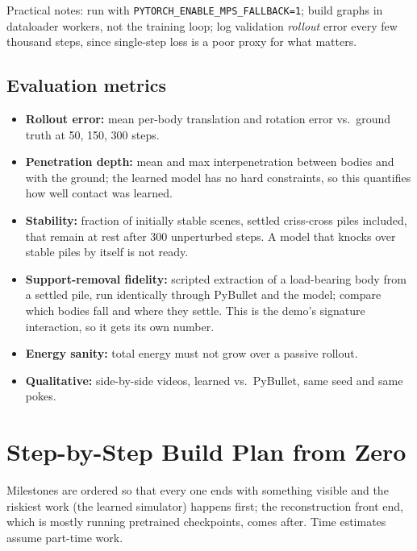\documentclass[11pt]{article}
\begin{document}
Practical notes: run with \texttt{PYTORCH\_ENABLE\_MPS\_FALLBACK=1}; build graphs in dataloader workers, not the training loop; log validation \emph{rollout} error every few thousand steps, since single-step loss is a poor proxy for what matters.

\subsection{Evaluation metrics}
\begin{itemize}[itemsep=2pt]
  \item \textbf{Rollout error:} mean per-body translation and rotation error vs.\ ground truth at 50, 150, 300 steps.
  \item \textbf{Penetration depth:} mean and max interpenetration between bodies and with the ground; the learned model has no hard constraints, so this quantifies how well contact was learned.
  \item \textbf{Stability:} fraction of initially stable scenes, settled criss-cross piles included, that remain at rest after 300 unperturbed steps. A model that knocks over stable piles by itself is not ready.
  \item \textbf{Support-removal fidelity:} scripted extraction of a load-bearing body from a settled pile, run identically through PyBullet and the model; compare which bodies fall and where they settle. This is the demo's signature interaction, so it gets its own number.
  \item \textbf{Energy sanity:} total energy must not grow over a passive rollout.
  \item \textbf{Qualitative:} side-by-side videos, learned vs.\ PyBullet, same seed and same pokes.
\end{itemize}

\section{Step-by-Step Build Plan from Zero}
\label{sec:roadmap}

Milestones are ordered so that every one ends with something visible and the riskiest work (the learned simulator) happens first; the reconstruction front end, which is mostly running pretrained checkpoints, comes after. Time estimates assume part-time work.
\end{document}
